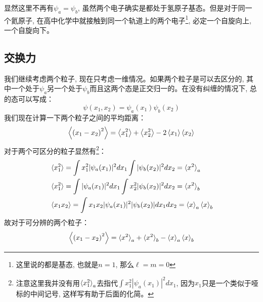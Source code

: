 显然这里不再有$\psi_a=\psi_b$, 虽然两个电子确实是都处于氢原子基态。但是对于同一个氦原子, 在高中化学中就接触到同一个轨道上的两个电子\footnote{这里说的都是基态, 也就是$n=1$, 那么$\ell=m=0$}, 必定一个自旋向上, 一个自旋向下。
\subsection{交换力}
我们继续考虑两个粒子, 现在只考虑一维情况。如果两个粒子是可以去区分的, 其中一个处于$\psi_a$另一个处于$\psi_b$而且这两个态是正交归一的。在没有纠缠的情况下, 总的态可以写成：
\[\psi(x_1,x_2)=\psi_a(x_1)\psi_b(x_2)\]
我们现在计算一下两个粒子之间的平均距离：
\[\Braket{\left(x_1-x_2\right)^2}=\Braket{x_1^2}+\Braket{x_2^2}-2\Braket{x_1}\Braket{x_2}\]
对于两个可区分的粒子显然有\footnote{注意这里我并没有用$\braket{x_1^2}_a$去指代$\int x_1^2|\psi_a(x_1)|^2dx_1$, 因为$x_1$只是一个类似于哑标的中间记号, 这样写有助于后面的化简。}：
\begin{align*}
    &\braket{x_1^2}=\int x_1^2|\psi_a(x_1)|^2dx_1\int |\psi_b(x_2)|^2dx_2=\braket{x^2}_a\\
    &\braket{x_1^2}=\int |\psi_a(x_1)|^2dx_1\int x_2^2 |\psi_b(x_2)|^2dx_2=\braket{x^2}_b\\
    &\braket{x_1x_2}=\int x_1x_2|\psi_a(x_1)|^2|\psi_b(x_2)|dx_1dx_2=\braket{x}_a\braket{x}_b
\end{align*}
故对于可分辨的两个粒子：
\begin{equation}
    \label{eq:5.7}
    \Braket{\left(x_1-x_2\right)^2}=\braket{x^2}_a+\braket{x^2}_b-\braket{x}_a\braket{x}_b
\end{equation}

